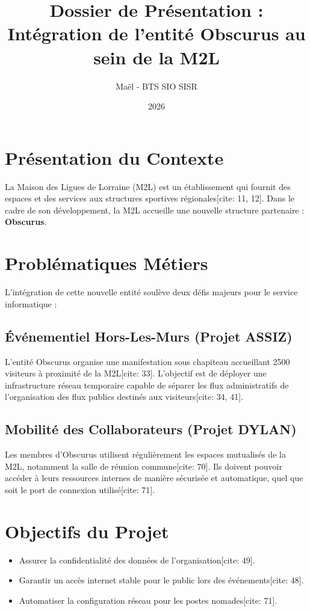 \documentclass[12pt,a4paper]{article}
\title{Dossier de Présentation : Intégration de l'entité Obscurus au sein de la M2L}
\author{Maël - BTS SIO SISR}
\date{2026}
\begin{document}
\maketitle

\section{Présentation du Contexte}
La Maison des Ligues de Lorraine (M2L) est un établissement qui fournit des espaces et des services aux structures sportives régionales[cite: 11, 12]. Dans le cadre de son développement, la M2L accueille une nouvelle structure partenaire : \textbf{Obscurus}.

\section{Problématiques Métiers}
L'intégration de cette nouvelle entité soulève deux défis majeurs pour le service informatique :

\subsection{Événementiel Hors-Les-Murs (Projet ASSIZ)}
L'entité Obscurus organise une manifestation sous chapiteau accueillant 2500 visiteurs à proximité de la M2L[cite: 33]. L'objectif est de déployer une infrastructure réseau temporaire capable de séparer les flux administratifs de l'organisation des flux publics destinés aux visiteurs[cite: 34, 41].

\subsection{Mobilité des Collaborateurs (Projet DYLAN)}
Les membres d'Obscurus utilisent régulièrement les espaces mutualisés de la M2L, notamment la salle de réunion commune[cite: 70]. Ils doivent pouvoir accéder à leurs ressources internes de manière sécurisée et automatique, quel que soit le port de connexion utilisé[cite: 71].

\section{Objectifs du Projet}
\begin{itemize}
    \item Assurer la confidentialité des données de l'organisation[cite: 49].
    \item Garantir un accès internet stable pour le public lors des événements[cite: 48].
    \item Automatiser la configuration réseau pour les postes nomades[cite: 71].
\end{itemize}
\end{document}

